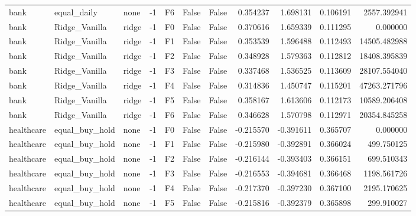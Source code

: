 \begin{tabular}{lllrlllrrrr}
      bank &    equal\_daily &      none &    -1 &  F6 &           False &            False &  0.354237 &  1.698131 & 0.106191 &      2557.392941 \\
      bank &  Ridge\_Vanilla &     ridge &    -1 &  F0 &           False &            False &  0.370616 &  1.659339 & 0.111295 &         0.000000 \\
      bank &  Ridge\_Vanilla &     ridge &    -1 &  F1 &           False &            False &  0.353539 &  1.596488 & 0.112493 &     14505.482988 \\
      bank &  Ridge\_Vanilla &     ridge &    -1 &  F2 &           False &            False &  0.348928 &  1.579363 & 0.112812 &     18408.395839 \\
      bank &  Ridge\_Vanilla &     ridge &    -1 &  F3 &           False &            False &  0.337468 &  1.536525 & 0.113609 &     28107.554040 \\
      bank &  Ridge\_Vanilla &     ridge &    -1 &  F4 &           False &            False &  0.314836 &  1.450747 & 0.115201 &     47263.271796 \\
      bank &  Ridge\_Vanilla &     ridge &    -1 &  F5 &           False &            False &  0.358167 &  1.613606 & 0.112173 &     10589.206408 \\
      bank &  Ridge\_Vanilla &     ridge &    -1 &  F6 &           False &            False &  0.346628 &  1.570798 & 0.112971 &     20354.845258 \\
healthcare & equal\_buy\_hold &      none &    -1 &  F0 &           False &            False & -0.215570 & -0.391611 & 0.365707 &         0.000000 \\
healthcare & equal\_buy\_hold &      none &    -1 &  F1 &           False &            False & -0.215980 & -0.392891 & 0.366024 &       499.750125 \\
healthcare & equal\_buy\_hold &      none &    -1 &  F2 &           False &            False & -0.216144 & -0.393403 & 0.366151 &       699.510343 \\
healthcare & equal\_buy\_hold &      none &    -1 &  F3 &           False &            False & -0.216553 & -0.394681 & 0.366468 &      1198.561726 \\
healthcare & equal\_buy\_hold &      none &    -1 &  F4 &           False &            False & -0.217370 & -0.397230 & 0.367100 &      2195.170625 \\
healthcare & equal\_buy\_hold &      none &    -1 &  F5 &           False &            False & -0.215816 & -0.392379 & 0.365898 &       299.910027 \\

\end{tabular}
